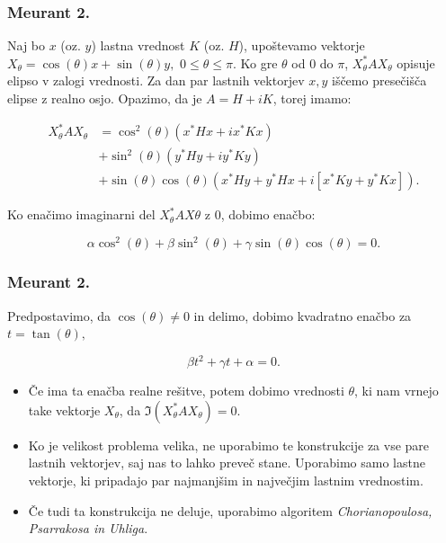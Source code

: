 \documentclass{beamer}
\begin{document}
\begin{frame}
\frametitle{Meurant 2.}
Naj bo $x$ (oz. $y$) lastna vrednost $K$ (oz. $H$), upoštevamo vektorje $X_\theta =\cos(\theta)x+\sin(\theta)y,$ $0\le\theta\le\pi$. Ko gre $\theta$ od 0 do $\pi$, $X_\theta ^\ast AX_\theta$ opisuje elipso v zalogi vrednosti. Za dan par lastnih vektorjev $x,y$ iščemo presečišča elipse z realno osjo. Opazimo, da je $A=H+iK$, torej imamo:\pause
\begin{block}{}
\begin{align*}
X_\theta^\ast AX_\theta &= \cos^2(\theta)(x^\ast Hx + ix^\ast Kx)\\ 
&+ \sin^2(\theta)(y^\ast Hy + iy^\ast Ky)\\ 
&+\sin(\theta)\cos(\theta)(x^\ast Hy +y^\ast Hx +i[x^\ast Ky +y^\ast Kx]).
\end{align*}
\end{block}\pause
Ko enačimo imaginarni del $X_\theta ^\ast AX\theta$ z 0, dobimo enačbo:\pause
\begin{block}{}
$$\alpha \cos^2(\theta) +\beta \sin^2(\theta) +\gamma \sin(\theta)\cos(\theta)=0.$$
\end{block}
\end{frame}
\begin{frame}
\frametitle{Meurant 2.}
Predpostavimo, da $\cos(\theta) \not =0$ in delimo, dobimo kvadratno enačbo za $t=\tan(\theta),$
\begin{block}{}
$$\beta t^2 +\gamma t +\alpha =0.$$
\end{block}
\begin{itemize}
\item Če ima ta enačba realne rešitve, potem dobimo vrednosti $\theta$, ki nam vrnejo take vektorje $X_\theta$, da $\Im(X_\theta ^\ast AX_\theta)=0$. 
\item Ko je velikost problema velika, ne uporabimo te konstrukcije za vse pare lastnih vektorjev, saj nas to lahko preveč stane. Uporabimo samo lastne vektorje, ki pripadajo par najmanjšim in največjim lastnim vrednostim.
\item Če tudi ta konstrukcija ne deluje, uporabimo algoritem \emph{Chorianopoulosa, Psarrakosa in Uhliga}.
\end{itemize}
\end{frame}
\end{document}
